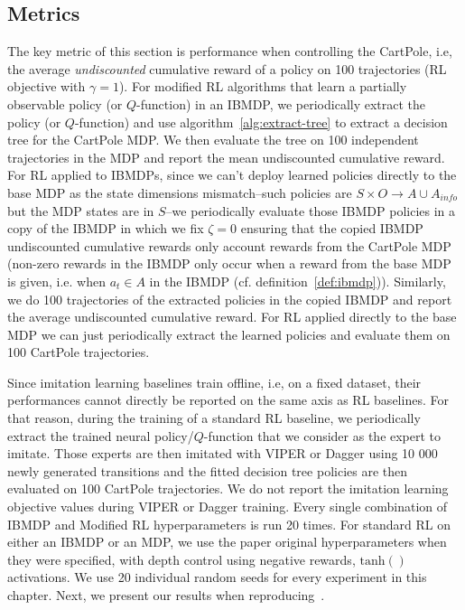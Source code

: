 \subsection{Metrics}
The key metric of this section is performance when controlling the CartPole, i.e, the average \textit{undiscounted} cumulative reward of a policy on 100 trajectories (RL objective with $\gamma=1$).
For modified RL algorithms that learn a partially observable policy (or $Q$-function) in an IBMDP, we periodically extract the policy (or $Q$-function) and use algorithm~\ref{alg:extract-tree} to extract a decision tree for the CartPole MDP. 
We then evaluate the tree on 100 independent trajectories in the MDP and report the mean undiscounted cumulative reward.
For RL applied to IBMDPs, since we can't deploy learned policies directly to the base MDP as the state dimensions mismatch--such policies are $S\times O\rightarrow A \cup A_{info}$ but the MDP states are in $S$--we periodically evaluate those IBMDP policies in a copy of the IBMDP in which we fix $\zeta=0$ ensuring that the copied IBMDP undiscounted cumulative rewards only account rewards from the CartPole MDP (non-zero rewards in the IBMDP only occur when a reward from the base MDP is given, i.e. when $a_t\in A$ in the IBMDP (cf. definition~\ref{def:ibmdp})).
Similarly, we do 100 trajectories of the extracted policies in the copied IBMDP and report the average undiscounted cumulative reward.
For RL applied directly to the base MDP we can just periodically extract the learned policies and evaluate them on 100 CartPole trajectories.

Since imitation learning baselines train offline, i.e, on a fixed dataset, their performances cannot directly be reported on the same axis as RL baselines.
For that reason, during the training of a standard RL baseline, we periodically extract the trained neural policy/$Q$-function that we consider as the expert to imitate.
Those experts are then imitated with VIPER or Dagger using 10 000 newly generated transitions and the fitted decision tree policies are then evaluated on 100 CartPole trajectories.
We do not report the imitation learning objective values during VIPER or Dagger training.
Every single combination of IBMDP and Modified RL hyperparameters is run 20 times.
For standard RL on either an IBMDP or an MDP, we use the paper original hyperparameters when they were specified, with depth control using negative rewards, $\operatorname{tanh()}$ activations.
We use 20 individual random seeds for every experiment in this chapter.
Next, we present our results when reproducing~\cite[table 1]{topin2021iterative}.

